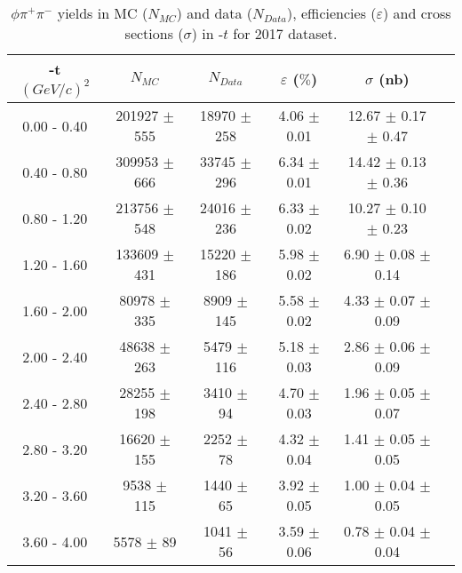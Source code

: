 \begin{center}
\begin{table}[H]
    \caption{$\phi \pi^{+}\pi^{-}$ yields in MC ($N_{MC}$) and data ($N_{Data}$), efficiencies ($\varepsilon$) and cross sections ($\sigma$) in -$t$ for 2017 dataset.}
    \label{tab.xsec_ul.phi2pi.2.2}
    \begin{tabular}{|c|c|c|c|c|c|}
    \hline
    -t $(GeV/c)^{2}$ & $N_{MC}$ & $N_{Data}$ & $\varepsilon$ ($\%$) & $\sigma$ (nb) \\ 
    \hline
    0.00 - 0.40 & 201927 $\pm$ 555 & 18970 $\pm$ 258 & 4.06 $\pm$ 0.01 & 12.67 $\pm$ 0.17 $\pm$ 0.47 \\ 
    0.40 - 0.80 & 309953 $\pm$ 666 & 33745 $\pm$ 296 & 6.34 $\pm$ 0.01 & 14.42 $\pm$ 0.13 $\pm$ 0.36 \\ 
    0.80 - 1.20 & 213756 $\pm$ 548 & 24016 $\pm$ 236 & 6.33 $\pm$ 0.02 & 10.27 $\pm$ 0.10 $\pm$ 0.23 \\ 
    1.20 - 1.60 & 133609 $\pm$ 431 & 15220 $\pm$ 186 & 5.98 $\pm$ 0.02 & 6.90 $\pm$ 0.08 $\pm$ 0.14 \\ 
    1.60 - 2.00 & 80978 $\pm$ 335 & 8909 $\pm$ 145 & 5.58 $\pm$ 0.02 & 4.33 $\pm$ 0.07 $\pm$ 0.09 \\ 
    2.00 - 2.40 & 48638 $\pm$ 263 & 5479 $\pm$ 116 & 5.18 $\pm$ 0.03 & 2.86 $\pm$ 0.06 $\pm$ 0.09 \\ 
    2.40 - 2.80 & 28255 $\pm$ 198 & 3410 $\pm$ 94 & 4.70 $\pm$ 0.03 & 1.96 $\pm$ 0.05 $\pm$ 0.07 \\ 
    2.80 - 3.20 & 16620 $\pm$ 155 & 2252 $\pm$ 78 & 4.32 $\pm$ 0.04 & 1.41 $\pm$ 0.05 $\pm$ 0.05 \\ 
    3.20 - 3.60 & 9538 $\pm$ 115 & 1440 $\pm$ 65 & 3.92 $\pm$ 0.05 & 1.00 $\pm$ 0.04 $\pm$ 0.05 \\ 
    3.60 - 4.00 & 5578 $\pm$ 89 & 1041 $\pm$ 56 & 3.59 $\pm$ 0.06 & 0.78 $\pm$ 0.04 $\pm$ 0.04 \\    
   \hline
\end{tabular}
\end{table}
\null
\vfill
\end{center}
   
